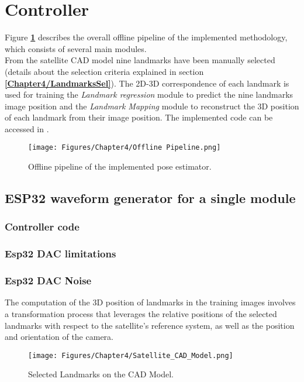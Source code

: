 \section{Controller}
Figure \textbf{\ref{fig:Offline Pipeline}} describes the overall offline pipeline of the implemented methodology, which consists of several main modules.\\
From the satellite CAD model nine landmarks have been manually selected (details about the selection criteria explained in section \textbf{\ref{Chapter4/LandmarksSel}}). The 2D-3D correspondence of each landmark is used for training the \textit{Landmark regression} module to predict the nine landmarks image position and the \textit{Landmark Mapping} module to reconstruct the 3D position of each landmark from their image position.
The implemented code can be accessed in \cite{JMF}.

\begin{figure}[th]
    \centering
    \texttt{[image: Figures/Chapter4/Offline Pipeline.png]}
    \caption[Offline pipeline]{Offline pipeline of the implemented pose estimator.}
    \label{fig:Offline Pipeline}
\end{figure}

\subsection{ESP32 waveform generator for a single module}

\subsubsection{Controller code}

\subsubsection{Esp32 DAC limitations}

\subsubsection{Esp32 DAC Noise}
\label{Chapter4/2D-3D}
The computation of the 3D position of landmarks in the training images involves a transformation process that leverages the relative positions of the selected landmarks with respect to the satellite's reference system, as well as the position and orientation of the camera.

\begin{figure}[th]
    \centering
    \texttt{[image: Figures/Chapter4/Satellite\_CAD\_Model.png]}
    \caption[CAD Model]{Selected Landmarks on the CAD Model.}
    \label{fig:CAD Model}
\end{figure}

